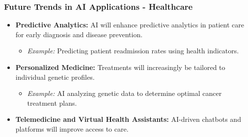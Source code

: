 \documentclass{beamer}
\begin{document}
\begin{frame}[fragile]
    \frametitle{Future Trends in AI Applications - Healthcare}
    
    \begin{itemize}
        \item \textbf{Predictive Analytics:} AI will enhance predictive analytics in patient care for early diagnosis and disease prevention.
        \begin{itemize}
            \item \textit{Example:} Predicting patient readmission rates using health indicators.
        \end{itemize}
        
        \item \textbf{Personalized Medicine:} Treatments will increasingly be tailored to individual genetic profiles.
        \begin{itemize}
            \item \textit{Example:} AI analyzing genetic data to determine optimal cancer treatment plans.
        \end{itemize}
        
        \item \textbf{Telemedicine and Virtual Health Assistants:} AI-driven chatbots and platforms will improve access to care.
    \end{itemize}
\end{frame}
\end{document}
